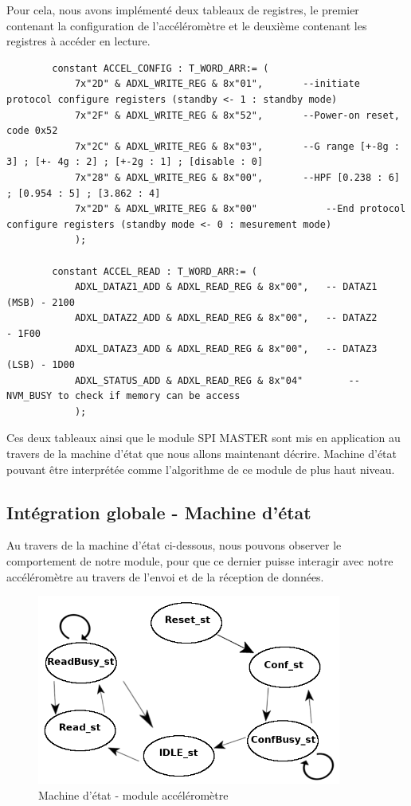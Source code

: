 \documentclass[french,a4paper,12pt]{report}
\begin{document}
			Pour cela, nous avons implémenté deux tableaux de registres, le premier contenant la configuration de l'accéléromètre et le deuxième contenant les registres à accéder en lecture.
		\begin{lstlisting}
 		constant ACCEL_CONFIG : T_WORD_ARR:= (
			7x"2D" & ADXL_WRITE_REG & 8x"01",		--initiate protocol configure registers (standby <- 1 : standby mode)
			7x"2F" & ADXL_WRITE_REG & 8x"52",		--Power-on reset, code 0x52		
			7x"2C" & ADXL_WRITE_REG & 8x"03",		--G range [+-8g : 3] ; [+- 4g : 2] ; [+-2g : 1] ; [disable : 0]
			7x"28" & ADXL_WRITE_REG & 8x"00",		--HPF [0.238 : 6] ; [0.954 : 5] ; [3.862 : 4]
			7x"2D" & ADXL_WRITE_REG & 8x"00"			--End protocol configure registers (standby mode <- 0 : mesurement mode)
			);
			
		constant ACCEL_READ : T_WORD_ARR:= (
			ADXL_DATAZ1_ADD & ADXL_READ_REG & 8x"00", 	-- DATAZ1 (MSB) - 2100
			ADXL_DATAZ2_ADD & ADXL_READ_REG & 8x"00", 	-- DATAZ2		 		- 1F00
			ADXL_DATAZ3_ADD & ADXL_READ_REG & 8x"00", 	-- DATAZ3 (LSB)	- 1D00
			ADXL_STATUS_ADD & ADXL_READ_REG & 8x"04"		-- NVM_BUSY to check if memory can be access
			);
		\end{lstlisting}
		
		Ces deux tableaux ainsi que le module SPI MASTER sont mis en application au travers de la machine d'état que nous allons maintenant décrire. Machine d'état pouvant être interprétée comme l'algorithme de ce module de plus haut niveau.			
		
		\subsection{Intégration globale - Machine d'état}
				Au travers de la machine d'état ci-dessous, nous pouvons observer le comportement de notre module, pour que ce dernier puisse interagir avec notre accéléromètre au travers de l'envoi et de la réception de données.
		
			\begin{figure}[!ht]
    		\center
  			\includegraphics[width=10cm]{acc_StateMach.png}
    		\caption{Machine d'état - module accéléromètre}
			\end{figure}
			
\end{document}
